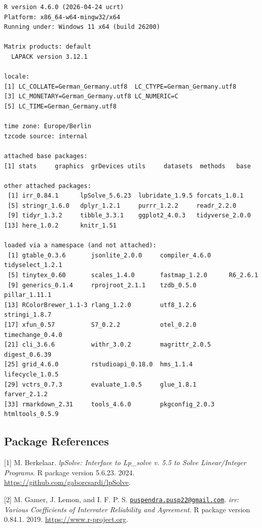 \documentclass[
  letterpaper,
  DIV=11,
  numbers=noendperiod]{scrartcl}
\begin{document}
\begin{verbatim}
R version 4.6.0 (2026-04-24 ucrt)
Platform: x86_64-w64-mingw32/x64
Running under: Windows 11 x64 (build 26200)

Matrix products: default
  LAPACK version 3.12.1

locale:
[1] LC_COLLATE=German_Germany.utf8  LC_CTYPE=German_Germany.utf8   
[3] LC_MONETARY=German_Germany.utf8 LC_NUMERIC=C                   
[5] LC_TIME=German_Germany.utf8    

time zone: Europe/Berlin
tzcode source: internal

attached base packages:
[1] stats     graphics  grDevices utils     datasets  methods   base     

other attached packages:
 [1] irr_0.84.1      lpSolve_5.6.23  lubridate_1.9.5 forcats_1.0.1  
 [5] stringr_1.6.0   dplyr_1.2.1     purrr_1.2.2     readr_2.2.0    
 [9] tidyr_1.3.2     tibble_3.3.1    ggplot2_4.0.3   tidyverse_2.0.0
[13] here_1.0.2      knitr_1.51     

loaded via a namespace (and not attached):
 [1] gtable_0.3.6       jsonlite_2.0.0     compiler_4.6.0     tidyselect_1.2.1  
 [5] tinytex_0.60       scales_1.4.0       fastmap_1.2.0      R6_2.6.1          
 [9] generics_0.1.4     rprojroot_2.1.1    tzdb_0.5.0         pillar_1.11.1     
[13] RColorBrewer_1.1-3 rlang_1.2.0        utf8_1.2.6         stringi_1.8.7     
[17] xfun_0.57          S7_0.2.2           otel_0.2.0         timechange_0.4.0  
[21] cli_3.6.6          withr_3.0.2        magrittr_2.0.5     digest_0.6.39     
[25] grid_4.6.0         rstudioapi_0.18.0  hms_1.1.4          lifecycle_1.0.5   
[29] vctrs_0.7.3        evaluate_1.0.5     glue_1.8.1         farver_2.1.2      
[33] rmarkdown_2.31     tools_4.6.0        pkgconfig_2.0.3    htmltools_0.5.9   
\end{verbatim}

\subsection{Package References}\label{sec-packages-references}

{[}1{]} M. Berkelaar. \emph{lpSolve: Interface to Lp\_solve v. 5.5 to
Solve Linear/Integer Programs}. R package version 5.6.23. 2024.
\url{https://github.com/gaborcsardi/lpSolve}.

{[}2{]} M. Gamer, J. Lemon, and I. F. P. S.
\href{mailto:puspendra.pusp22@gmail.com}{\nolinkurl{puspendra.pusp22@gmail.com}}.
\emph{irr: Various Coefficients of Interrater Reliability and
Agreement}. R package version 0.84.1. 2019.
\url{https://www.r-project.org}.
\end{document}
